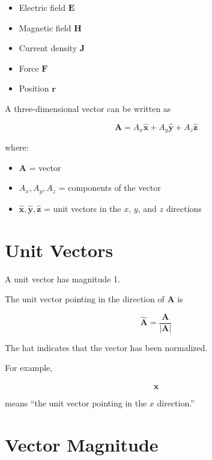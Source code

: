 \documentclass[11pt]{article}
\newcommand{\vect}[1]{\mathbf{#1}}
\newcommand{\uvect}[1]{\hat{\mathbf{#1}}}
\begin{document}
\begin{itemize}
    \item Electric field $\vect{E}$
    \item Magnetic field $\vect{H}$
    \item Current density $\vect{J}$
    \item Force $\vect{F}$
    \item Position $\vect{r}$
\end{itemize}

A three-dimensional vector can be written as

\[
\boxed{
\vect{A}
=
A_x\uvect{x}
+
A_y\uvect{y}
+
A_z\uvect{z}
}
\]

where:

\begin{itemize}
    \item $\vect{A}$ = vector
    \item $A_x,A_y,A_z$ = components of the vector
    \item $\uvect{x},\uvect{y},\uvect{z}$ = unit vectors in the $x$, $y$, and $z$ directions
\end{itemize}



\section{Unit Vectors}

A unit vector has magnitude 1.

The unit vector pointing in the direction of $\vect{A}$ is

\[
\boxed{
\hat{\vect{A}}
=
\frac{\vect{A}}{|\vect{A}|}
}
\]

The hat indicates that the vector has been normalized.

For example,

\[
\uvect{x}
\]

means ``the unit vector pointing in the $x$ direction.''



\section{Vector Magnitude}
\end{document}
